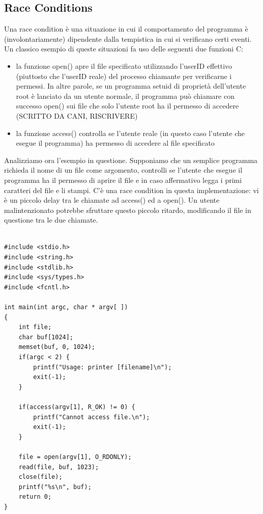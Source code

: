 \subsection{Race Conditions}
Una race condition è una situazione in cui il comportamento del programma è (involontariamente) dipendente dalla tempistica in cui si verificano certi eventi. Un classico esempio di queste situazioni fa uso delle seguenti due funzioni C:
\begin{itemize}
  \item la funzione open() apre il file specificato utilizzando l'userID effettivo (piuttosto che l’userID reale) del processo chiamante per verificarne i
permessi. In altre parole, se un programma setuid di proprietà dell'utente root è
lanciato da un utente normale, il programma può chiamare con successo open() sui file che solo l'utente root ha il permesso di accedere (SCRITTO DA CANI, RISCRIVERE)
  \item la funzione access() controlla se l'utente reale (in questo caso l'utente che esegue il programma) ha permesso di accedere al file specificato
\end{itemize}
Analizziamo ora l'esempio in questione. Supponiamo che un semplice programma richieda il nome di un file come argomento, controlli se l'utente che esegue il programma ha il permesso di aprire il file e in caso affermativo legga i primi caratteri del file e li stampi. C'è una race condition in questa implementazione:  vi è un piccolo delay tra le chiamate ad access() ed a open(). Un utente malintenzionato potrebbe sfruttare questo piccolo ritardo, modificando il file in questione tra le due chiamate.
\begin{algorithm}
\begin{lstlisting}[caption={Esempio codice vulnerabile a race conditions}]

#include <stdio.h>
#include <string.h>
#include <stdlib.h>
#include <sys/types.h>
#include <fcntl.h>

int main(int argc, char * argv[ ])
{
	int file;
	char buf[1024];
	memset(buf, 0, 1024);
	if(argc < 2) {
		printf("Usage: printer [filename]\n");
		exit(-1);
	}
	
	if(access(argv[1], R_OK) != 0) {
		printf("Cannot access file.\n");
		exit(-1);
	}
	
	file = open(argv[1], O_RDONLY);
	read(file, buf, 1023);
	close(file);
	printf("%s\n", buf);
	return 0;
}

\end{lstlisting}
\end{algorithm}


